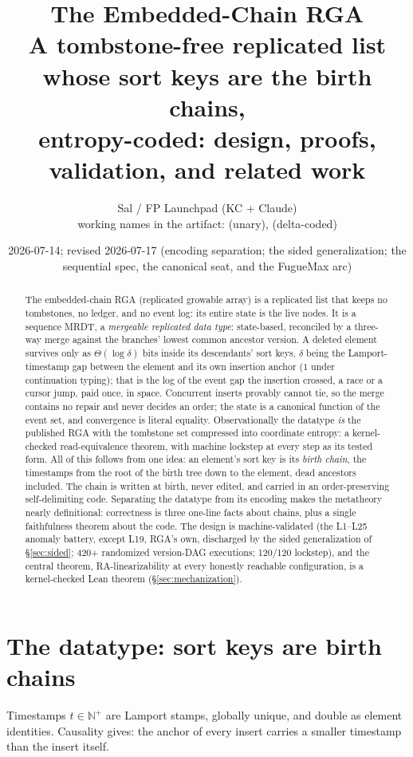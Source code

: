\documentclass[11pt]{article}
\title{\bfseries The Embedded-Chain RGA\\[2pt]
\large A tombstone-free replicated list whose sort keys are the birth
chains,\\ entropy-coded: design, proofs, validation, and
related work}
\author{Sal / FP Launchpad (KC + Claude)\\
\small working names in the artifact: \code{embed-tree} (unary),
\code{embed-code} (delta-coded)}
\date{2026-07-14; revised 2026-07-17 (encoding separation; the sided
generalization; the sequential spec, the canonical seat, and the
FugueMax arc)}
\begin{document}
\maketitle
\sloppy

\begin{abstract}
\noindent
The embedded-chain RGA (replicated growable array) is a replicated
list that keeps no tombstones, no ledger, and no event log: its
entire state is the live nodes. It is a sequence MRDT, a
\emph{mergeable replicated data type}: state-based, reconciled by a
three-way merge against the branches' lowest common ancestor
version. A deleted element survives only as
$\Theta(\log \delta)$ bits inside its descendants' sort keys,
$\delta$ being the Lamport-timestamp gap between the element and its
own insertion anchor ($1$ under continuation typing); that is the
log of the event gap the insertion crossed, a race or a cursor
jump, paid once, in space.
Concurrent inserts provably cannot tie, so the merge
contains no repair and never decides an order; the state is a
canonical function of the event set, and convergence is literal
equality. Observationally the datatype \emph{is} the published RGA
with the tombstone set compressed into coordinate entropy: a
kernel-checked read-equivalence theorem, with machine lockstep at
every step as its tested form. All of this follows
from one idea: an element's sort key is its \emph{birth chain}, the
timestamps from the root of the birth tree down to the element, dead
ancestors included. The chain is written at birth, never edited, and
carried in an order-preserving self-delimiting code. Separating the datatype
from its encoding makes the metatheory nearly definitional:
correctness is three one-line facts about chains, plus a single
faithfulness theorem about the code. The design is machine-validated
(the L1--L25 anomaly battery, except L19, RGA's own, discharged by
the sided generalization of \S\ref{sec:sided}; 420+ randomized
version-DAG executions; 120/120 lockstep), and the central theorem,
RA-linearizability at every honestly reachable configuration,
is a kernel-checked Lean theorem (\S\ref{sec:mechanization}).
\end{abstract}

\section{The datatype: sort keys are birth chains}
\label{sec:design}

Timestamps $t \in \mathbb{N}^{+}$ are Lamport stamps, globally unique,
and double as element identities. Causality gives: the anchor of every
insert carries a smaller timestamp than the insert itself.
\end{document}
